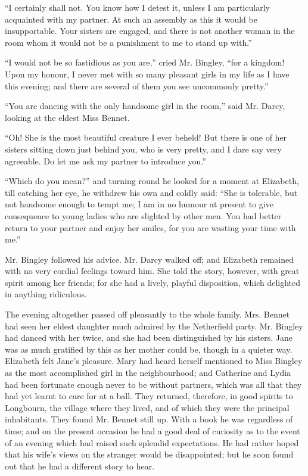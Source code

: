       “I certainly shall not. You know how I detest it, unless I am
      particularly acquainted with my partner. At such an assembly as
      this it would be insupportable. Your sisters are engaged, and
      there is not another woman in the room whom it would not be a
      punishment to me to stand up with.”

      “I would not be so fastidious as you are,” cried Mr. Bingley,
      “for a kingdom! Upon my honour, I never met with so many pleasant
      girls in my life as I have this evening; and there are several of
      them you see uncommonly pretty.”

      “You are dancing with the only handsome girl in the room,” said
      Mr. Darcy, looking at the eldest Miss Bennet.

      “Oh! She is the most beautiful creature I ever beheld! But there
      is one of her sisters sitting down just behind you, who is very
      pretty, and I dare say very agreeable. Do let me ask my partner
      to introduce you.”

      “Which do you mean?” and turning round he looked for a moment at
      Elizabeth, till catching her eye, he withdrew his own and coldly
      said: “She is tolerable, but not handsome enough to tempt me; I
      am in no humour at present to give consequence to young ladies
      who are slighted by other men. You had better return to your
      partner and enjoy her smiles, for you are wasting your time with
      me.”

      Mr. Bingley followed his advice. Mr. Darcy walked off; and
      Elizabeth remained with no very cordial feelings toward him. She
      told the story, however, with great spirit among her friends; for
      she had a lively, playful disposition, which delighted in
      anything ridiculous.

      The evening altogether passed off pleasantly to the whole family.
      Mrs. Bennet had seen her eldest daughter much admired by the
      Netherfield party. Mr. Bingley had danced with her twice, and she
      had been distinguished by his sisters. Jane was as much gratified
      by this as her mother could be, though in a quieter way.
      Elizabeth felt Jane’s pleasure. Mary had heard herself mentioned
      to Miss Bingley as the most accomplished girl in the
      neighbourhood; and Catherine and Lydia had been fortunate enough
      never to be without partners, which was all that they had yet
      learnt to care for at a ball. They returned, therefore, in good
      spirits to Longbourn, the village where they lived, and of which
      they were the principal inhabitants. They found Mr. Bennet still
      up. With a book he was regardless of time; and on the present
      occasion he had a good deal of curiosity as to the event of an
      evening which had raised such splendid expectations. He had
      rather hoped that his wife’s views on the stranger would be
      disappointed; but he soon found out that he had a different story
      to hear.

